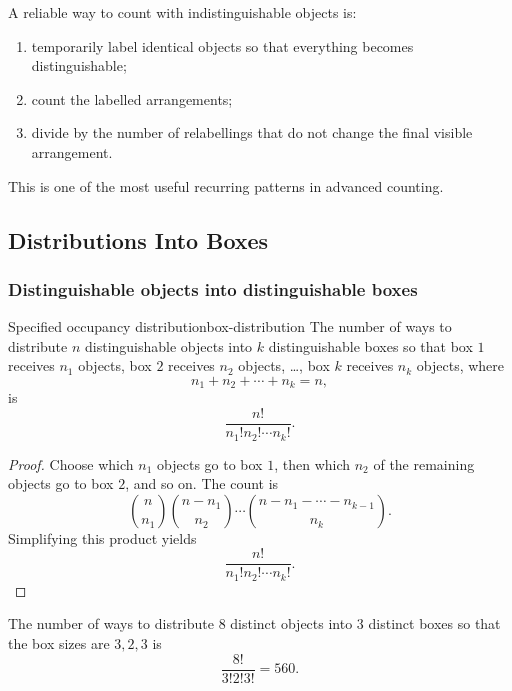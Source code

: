 \begin{extension}[title={Label-then-divide strategy}]
A reliable way to count with indistinguishable objects is:
\begin{enumerate}[leftmargin=*]
    \item temporarily label identical objects so that everything becomes distinguishable;
    \item count the labelled arrangements;
    \item divide by the number of relabellings that do not change the final visible arrangement.
\end{enumerate}
This is one of the most useful recurring patterns in advanced counting.
\end{extension}

\subsection{Distributions Into Boxes}

\subsubsection{Distinguishable objects into distinguishable boxes}

\begin{theorem}{Specified occupancy distribution}{box-distribution}
The number of ways to distribute $n$ distinguishable objects into $k$ distinguishable boxes so that box $1$ receives $n_1$ objects, box $2$ receives $n_2$ objects, \dots, box $k$ receives $n_k$ objects, where
\[
n_1+n_2+\cdots+n_k=n,
\]
is
\[
\frac{n!}{n_1!n_2!\cdots n_k!}.
\]
\end{theorem}

\begin{proof}
Choose which $n_1$ objects go to box $1$, then which $n_2$ of the remaining objects go to box $2$, and so on. The count is
\[
\binom{n}{n_1}\binom{n-n_1}{n_2}\cdots \binom{n-n_1-\cdots-n_{k-1}}{n_k}.
\]
Simplifying this product yields
\[
\frac{n!}{n_1!n_2!\cdots n_k!}.
\]
\end{proof}

\begin{examplebox}[title={Distribution with fixed box sizes}]
The number of ways to distribute $8$ distinct objects into $3$ distinct boxes so that the box sizes are $3,2,3$ is
\[
\frac{8!}{3!2!3!}=560.
\]
\end{examplebox}

